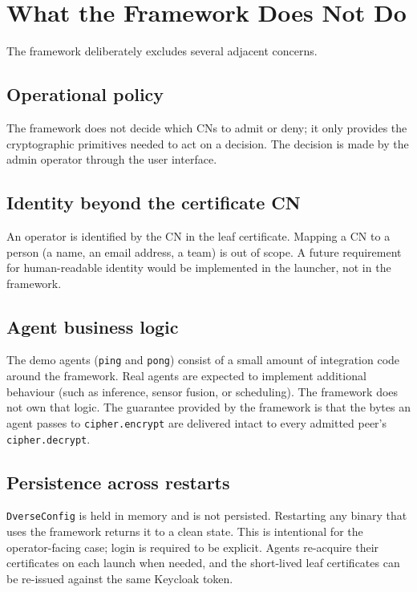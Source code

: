 \documentclass[11pt,a4paper]{article}
\begin{document}
\section{What the Framework Does Not Do}

The framework deliberately excludes several adjacent concerns.

\subsection{Operational policy}
The framework does not decide which CNs to admit or deny; it only
provides the cryptographic primitives needed to act on a
decision. The decision is made by the admin operator through the
user interface.

\subsection{Identity beyond the certificate CN}
An operator is identified by the CN in the leaf certificate.
Mapping a CN to a person (a name, an email address, a team) is
out of scope. A future requirement for human-readable identity
would be implemented in the launcher, not in the framework.

\subsection{Agent business logic}
The demo agents (\texttt{ping} and \texttt{pong}) consist of a
small amount of integration code around the framework. Real
agents are expected to implement additional behaviour (such as
inference, sensor fusion, or scheduling). The framework does not
own that logic. The guarantee provided by the framework is that
the bytes an agent passes to \texttt{cipher.encrypt} are
delivered intact to every admitted peer's \texttt{cipher.decrypt}.

\subsection{Persistence across restarts}
\texttt{DverseConfig} is held in memory and is not persisted.
Restarting any binary that uses the framework returns it to a
clean state. This is intentional for the operator-facing case;
login is required to be explicit. Agents re-acquire their
certificates on each launch when needed, and the short-lived
leaf certificates can be re-issued against the same Keycloak
token.
\end{document}
